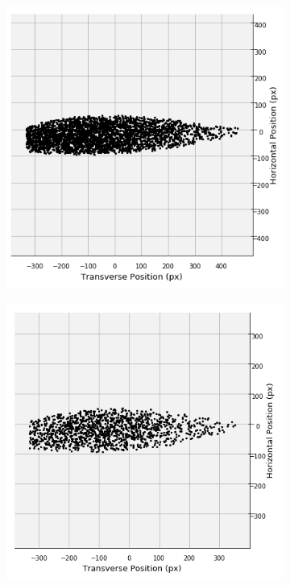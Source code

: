 \begin{figure}[ht]
\begin{subfigure}[b]{0.5\linewidth}
  \end{subfigure} 
  \begin{subfigure}[b]{0.5\linewidth}
    \includegraphics[width = 1\linewidth]{figures/final_fish_straight_horizontal.PNG} 
  \end{subfigure}
  \begin{subfigure}[b]{0.5\linewidth}
    \includegraphics[width = 1.02\linewidth]{figures/final_fish_turned_horizontal.png}

\end{subfigure}
\end{figure}

